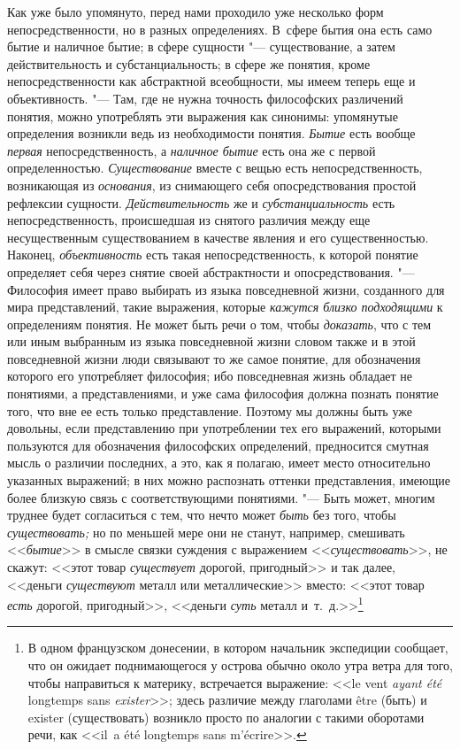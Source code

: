 Как уже было упомянуто, перед нами проходило уже несколько
форм непосредственности, но в разных определениях. В~сфере бытия она есть
само бытие и наличное бытие; в сфере сущности
"--- существование, а затем действительность и
субстанциальность; в сфере же понятия, кроме непосредственности как
абстрактной всеобщности, мы имеем теперь еще и объективность. "---
Там, где не нужна точность философских различений понятия,
можно употреблять эти выражения как синонимы: упомянутые определения
возникли ведь из необходимости понятия. {\em Бытие} есть вообще
{\em первая} непосредственность, а {\em наличное бытие} есть
она же с первой определенностью. {\em Существование}
вместе с вещью есть непосредственность, возникающая из {\em основания}, из
снимающего себя опосредствования простой рефлексии сущности.
{\em Действительность} же и {\em субстанциальность}
есть непосредственность, происшедшая из снятого различия
между еще несущественным существованием в качестве явления и его
существенностью. Наконец, {\em объективность} есть
такая непосредственность, к которой понятие определяет себя через снятие
своей абстрактности и опосредствования. "--- Философия имеет
право выбирать из языка повседневной жизни, созданного для мира
представлений, такие выражения, которые {\em кажутся близко подходящими}
к определениям понятия. Не может быть речи о том, чтобы {\em доказать}, что
с тем или иным выбранным из языка повседневной жизни словом также и в этой
повседневной жизни люди связывают то же самое понятие, для обозначения
которого его употребляет философия; ибо повседневная жизнь
обладает не понятиями, а представлениями, и уже сама философия должна
познать понятие того, что вне ее есть только представление. Поэтому мы
должны быть уже довольны, если представлению при употреблении тех его
выражений, которыми пользуются для обозначения философских определений,
предносится смутная мысль о различии последних, а это, как я полагаю, имеет
место относительно указанных выражений; в них можно распознать оттенки
представления, имеющие более близкую связь с соответствующими понятиями. "---
Быть может, многим труднее будет согласиться с тем, что нечто
может {\em быть} без того, чтобы {\em существовать;}
но по меньшей мере они не станут, например, смешивать <<{\em бытие}>>
в смысле связки суждения с выражением <<{\em существовать}>>, не
скажут: <<этот товар {\em существует}
дорогой, пригодный>> и так далее, <<деньги {\em существуют} металл
или металлические>> вместо: <<этот товар {\em есть} дорогой,
пригодный>>, <<деньги {\em суть} металл и~т.~д.>>\footnote{В одном
французском донесении, в котором начальник экспедиции
сообщает, что он ожидает поднимающегося у острова обычно около утра ветра
для того, чтобы направиться к материку, встречается выражение: <<le vent
{\em ayant été} longtemps sans
{\em exister}>>\label{bkm:bm64};
здесь различие между глаголами être (быть) и
exister (существовать) возникло просто по аналогии с такими
оборотами речи, как <<il~a été longtemps sans
m'écrire>>.}

